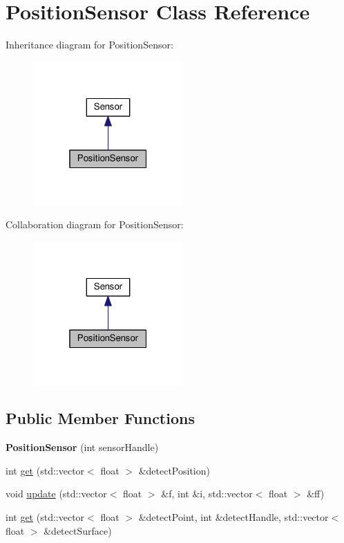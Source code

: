 \hypertarget{classPositionSensor}{}\section{Position\+Sensor Class Reference}
\label{classPositionSensor}


Inheritance diagram for Position\+Sensor\+:\nopagebreak
\begin{figure}[H]
\begin{center}
\leavevmode
\includegraphics[width=163pt]{classPositionSensor__inherit__graph}
\end{center}
\end{figure}


Collaboration diagram for Position\+Sensor\+:\nopagebreak
\begin{figure}[H]
\begin{center}
\leavevmode
\includegraphics[width=163pt]{classPositionSensor__coll__graph}
\end{center}
\end{figure}
\subsection*{Public Member Functions}
\begin{DoxyCompactItemize}
\item 
{\bfseries Position\+Sensor} (int sensor\+Handle)\hypertarget{classPositionSensor_a1bc5cb93c92c04eef26d406dbb304ead}{}\label{classPositionSensor_a1bc5cb93c92c04eef26d406dbb304ead}

\item 
int \hyperlink{classPositionSensor_a99c4b37f9f16912b15603d79dda386bc}{get} (std\+::vector$<$ float $>$ \&detect\+Position)
\item 
void \hyperlink{classPositionSensor_a4fb083aa0462a73627b11b7c0e408f09}{update} (std\+::vector$<$ float $>$ \&f, int \&i, std\+::vector$<$ float $>$ \&ff)
\item 
int \hyperlink{classPositionSensor_a0b8c45d846d3442d94e2ef767fddf31d}{get} (std\+::vector$<$ float $>$ \&detect\+Point, int \&detect\+Handle, std\+::vector$<$ float $>$ \&detect\+Surface)
\end{DoxyCompactItemize}

